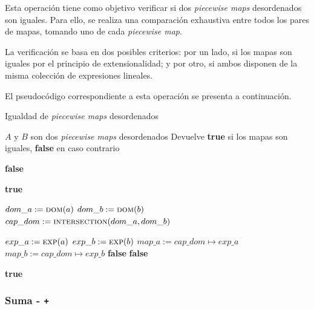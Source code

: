 Esta operación tiene como objetivo verificar si dos \textit{piecewise maps} desordenados son iguales. Para ello, se realiza una comparación exhaustiva entre todos los pares de mapas, tomando uno de cada \textit{piecewise map}.

La verificación se basa en dos posibles criterios: por un lado, si los mapas son iguales por el principio de extensionalidad; y por otro, si ambos disponen de la misma colección de expresiones lineales.

El pseudocódigo correspondiente a esta operación se presenta a continuación.

\begin{algorithm}
\caption{Igualdad de \textit{piecewise maps} desordenados}
\label{alg:==}
\begin{algorithmic}[1]
\Require $A$ y $B$ son dos \textit{piecewise maps} desordenados 
\Ensure Devuelve \textbf{true} si los mapas son iguales, \textbf{false} en caso contrario  

    \State \Return \textbf{false}
  \EndIf

    \State \Return \textbf{true}
  \EndIf

      \State $dom\_a := \Call{dom}{a}$
      \State $dom\_b:= \Call{dom}{b}$
      \State $cap\_dom := \Call{intersection}{dom\_a, dom\_b}$


          \State $exp\_a := \Call{exp}{a}$
          \State $exp\_b := \Call{exp}{b}$
          \State $map\_a := cap\_dom \mapsto exp\_a$
          \State $map\_b := cap\_dom \mapsto exp\_b$
            \State \Return \textbf{false}
          \EndIf
        \Else
            \State \Return \textbf{false}
          \EndIf
        \EndIf

      \EndIf

    \EndFor
  \EndFor

  \State \Return \textbf{true}
\EndFunction
\end{algorithmic}
\end{algorithm}

\newpage
\subsubsection{Suma - \texttt{+}}

